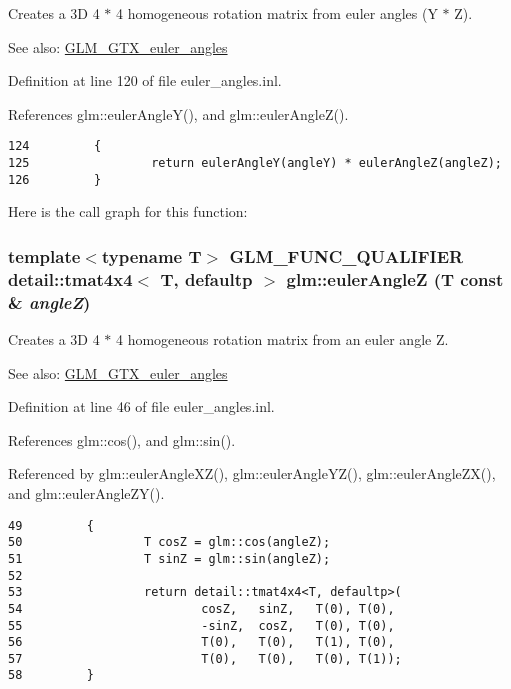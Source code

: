 Creates a 3D 4 $\ast$ 4 homogeneous rotation matrix from euler angles (Y $\ast$ Z). \begin{Desc}
\item[See also:]\hyperlink{group__gtx__euler__angles}{GLM\_\-GTX\_\-euler\_\-angles} \end{Desc}


Definition at line 120 of file euler\_\-angles.inl.

References glm::eulerAngleY(), and glm::eulerAngleZ().

\begin{Code}\begin{verbatim}124         {
125                 return eulerAngleY(angleY) * eulerAngleZ(angleZ);
126         }
\end{verbatim}
\end{Code}




Here is the call graph for this function:\hypertarget{group__gtx__euler__angles_ge77e2c08c118ecd34ffc8ca425d2cf77}{
\subsubsection[eulerAngleZ]{\setlength{\rightskip}{0pt plus 5cm}template$<$typename T$>$ GLM\_\-FUNC\_\-QUALIFIER detail::tmat4x4$<$ T, defaultp $>$ glm::eulerAngleZ (T const \& {\em angleZ})}}
\label{group__gtx__euler__angles_ge77e2c08c118ecd34ffc8ca425d2cf77}


Creates a 3D 4 $\ast$ 4 homogeneous rotation matrix from an euler angle Z. \begin{Desc}
\item[See also:]\hyperlink{group__gtx__euler__angles}{GLM\_\-GTX\_\-euler\_\-angles} \end{Desc}


Definition at line 46 of file euler\_\-angles.inl.

References glm::cos(), and glm::sin().

Referenced by glm::eulerAngleXZ(), glm::eulerAngleYZ(), glm::eulerAngleZX(), and glm::eulerAngleZY().

\begin{Code}\begin{verbatim}49         {
50                 T cosZ = glm::cos(angleZ);
51                 T sinZ = glm::sin(angleZ);
52 
53                 return detail::tmat4x4<T, defaultp>(
54                         cosZ,   sinZ,   T(0), T(0),
55                         -sinZ,  cosZ,   T(0), T(0),
56                         T(0),   T(0),   T(1), T(0),
57                         T(0),   T(0),   T(0), T(1));
58         }
\end{verbatim}
\end{Code}




